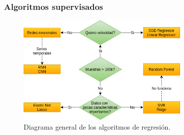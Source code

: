 \documentclass[a4paper,12pt]{article}
\begin{document}
\subsubsection{Algoritmos supervisados}
\begin{figure}[H]
	\begin{center}
		\includegraphics[width=0.75\textwidth]{regressiondiagram.png}
		\caption{Diagrama general de los algoritmos de regresión.}
		\label{fig:regressiondiagram.}
	\end{center}
\end{figure}
\end{document}
